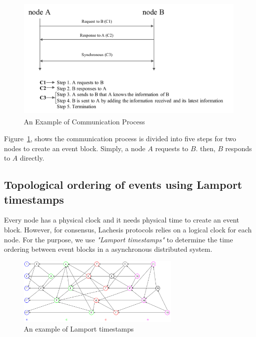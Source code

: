 \documentclass{article}
\begin{document}
\begin{figure}[H] \centering  
\includegraphics[height=6cm, width=0.7\columnwidth]{sync.pdf}
\caption{An Example of Communication Process}
\label{fig:communication process}
\end{figure}

Figure~\ref{fig:communication process}, shows the communication process is divided into five steps for two nodes to create an event block. Simply, a node $A$ requests to $B$. then, $B$ responds to $A$ directly.

\subsection{Topological ordering of events using Lamport timestamps}
Every node has a physical clock and it needs physical time to create an event block. However, for consensus, Lachesis protocols relies on a logical clock for each node. For the purpose, we use \textit{"Lamport timestamps"} \cite{lamport1978time} to determine the time ordering between event blocks in a asynchronous distributed system.


\begin{figure}[H] \centering  
	\includegraphics[width=0.7\textwidth, width=1.0\columnwidth]{Lamport_timestamps.pdf}
	\caption{An example of Lamport timestamps}
	\label{fig:Lamport}
\end{figure}
\end{document}

